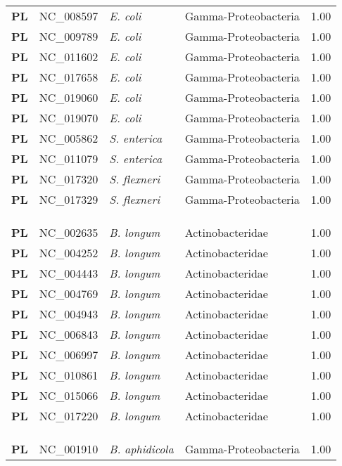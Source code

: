 \begin{adjustwidth}{-3cm}{2cm}
{\begin{supertabular}{>{\bfseries}l|p{0.1\textwidth}p{0.14\textwidth}l|l}
PL & NC\_008597 & \textit{E. coli} & Gamma-Proteobacteria & 1.00\\
PL & NC\_009789 & \textit{E. coli} & Gamma-Proteobacteria & 1.00\\
PL & NC\_011602 & \textit{E. coli} & Gamma-Proteobacteria & 1.00\\
PL & NC\_017658 & \textit{E. coli} & Gamma-Proteobacteria & 1.00\\
PL & NC\_019060 & \textit{E. coli} & Gamma-Proteobacteria & 1.00\\
PL & NC\_019070 & \textit{E. coli} & Gamma-Proteobacteria & 1.00\\
PL & NC\_005862 & \textit{S. enterica} & Gamma-Proteobacteria & 1.00\\
PL & NC\_011079 & \textit{S. enterica} & Gamma-Proteobacteria & 1.00\\
PL & NC\_017320 & \textit{S. flexneri} & Gamma-Proteobacteria & 1.00\\
PL & NC\_017329 & \textit{S. flexneri} & Gamma-Proteobacteria & 1.00\\
\\
\\
\hline\\
PL & NC\_002635 & \textit{B. longum} & Actinobacteridae & 1.00\\
PL & NC\_004252 & \textit{B. longum} & Actinobacteridae & 1.00\\
PL & NC\_004443 & \textit{B. longum} & Actinobacteridae & 1.00\\
PL & NC\_004769 & \textit{B. longum} & Actinobacteridae & 1.00\\
PL & NC\_004943 & \textit{B. longum} & Actinobacteridae & 1.00\\
PL & NC\_006843 & \textit{B. longum} & Actinobacteridae & 1.00\\
PL & NC\_006997 & \textit{B. longum} & Actinobacteridae & 1.00\\
PL & NC\_010861 & \textit{B. longum} & Actinobacteridae & 1.00\\
PL & NC\_015066 & \textit{B. longum} & Actinobacteridae & 1.00\\
PL & NC\_017220 & \textit{B. longum} & Actinobacteridae & 1.00\\
\\
\\
\hline\\
PL & NC\_001910 &  \textit{B. aphidicola} & Gamma-Proteobacteria & 1.00\\

\end{supertabular}}
\end{adjustwidth}
